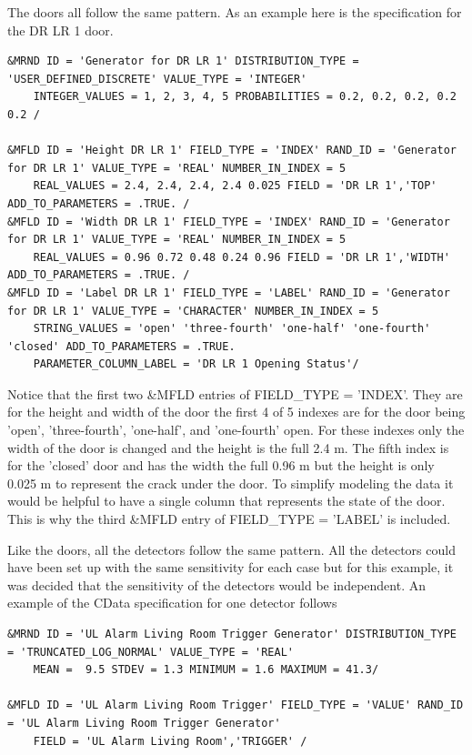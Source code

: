 \documentclass[12pt,twoside]{book}
\begin{document}
The doors all follow the same pattern. As an example here is the specification for the DR LR 1 door.

\vspace{\baselineskip}
\begin{lstlisting}
&MRND ID = 'Generator for DR LR 1' DISTRIBUTION_TYPE = 'USER_DEFINED_DISCRETE' VALUE_TYPE = 'INTEGER'
    INTEGER_VALUES = 1, 2, 3, 4, 5 PROBABILITIES = 0.2, 0.2, 0.2, 0.2 0.2 /

&MFLD ID = 'Height DR LR 1' FIELD_TYPE = 'INDEX' RAND_ID = 'Generator for DR LR 1' VALUE_TYPE = 'REAL' NUMBER_IN_INDEX = 5
    REAL_VALUES = 2.4, 2.4, 2.4, 2.4 0.025 FIELD = 'DR LR 1','TOP' ADD_TO_PARAMETERS = .TRUE. /
&MFLD ID = 'Width DR LR 1' FIELD_TYPE = 'INDEX' RAND_ID = 'Generator for DR LR 1' VALUE_TYPE = 'REAL' NUMBER_IN_INDEX = 5
    REAL_VALUES = 0.96 0.72 0.48 0.24 0.96 FIELD = 'DR LR 1','WIDTH' ADD_TO_PARAMETERS = .TRUE. /
&MFLD ID = 'Label DR LR 1' FIELD_TYPE = 'LABEL' RAND_ID = 'Generator for DR LR 1' VALUE_TYPE = 'CHARACTER' NUMBER_IN_INDEX = 5
    STRING_VALUES = 'open' 'three-fourth' 'one-half' 'one-fourth' 'closed' ADD_TO_PARAMETERS = .TRUE.
    PARAMETER_COLUMN_LABEL = 'DR LR 1 Opening Status'/
\end{lstlisting}

Notice that the first two  {\ct \&MFLD} entries of  {\ct FIELD\_TYPE = 'INDEX'}. They are for the height and width of the door the first 4 of 5 indexes are for the door being 'open', 'three-fourth', 'one-half', and  'one-fourth' open. For these indexes only the width of the door is changed and the height is the full 2.4 m. The fifth index is for the 'closed' door and has the width the full 0.96 m but the height is only 0.025 m to represent the crack under the door. To simplify modeling the data it would be helpful to have a single column that represents the state of the door. This is why the third {\ct \&MFLD} entry of {\ct FIELD\_TYPE = 'LABEL'} is included.

Like the doors, all the detectors follow the same pattern. All the detectors could have been set up with the same sensitivity for each case but for this example, it was decided that the sensitivity of the detectors would be independent. An example of the CData specification for one detector follows

\vspace{\baselineskip}
\begin{lstlisting}	
&MRND ID = 'UL Alarm Living Room Trigger Generator' DISTRIBUTION_TYPE = 'TRUNCATED_LOG_NORMAL' VALUE_TYPE = 'REAL'
    MEAN =  9.5 STDEV = 1.3 MINIMUM = 1.6 MAXIMUM = 41.3/
	
&MFLD ID = 'UL Alarm Living Room Trigger' FIELD_TYPE = 'VALUE' RAND_ID = 'UL Alarm Living Room Trigger Generator'
    FIELD = 'UL Alarm Living Room','TRIGGER' /
\end{lstlisting}
\end{document}
